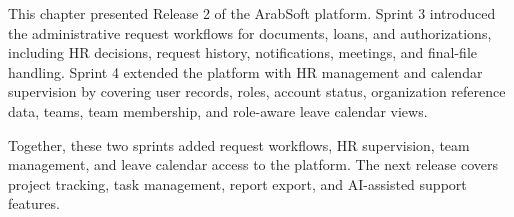 
{\fontsize{12}{18}\selectfont
\setlength{\parindent}{1.2cm}
\setlength{\parskip}{6pt}

\indent This chapter presented Release 2 of the ArabSoft platform. Sprint 3 introduced the administrative request workflows for documents, loans, and authorizations, including HR decisions, request history, notifications, meetings, and final-file handling. Sprint 4 extended the platform with HR management and calendar supervision by covering user records, roles, account status, organization reference data, teams, team membership, and role-aware leave calendar views.

\indent Together, these two sprints added request workflows, HR supervision, team management, and leave calendar access to the platform. The next release covers project tracking, task management, report export, and AI-assisted support features.

}
